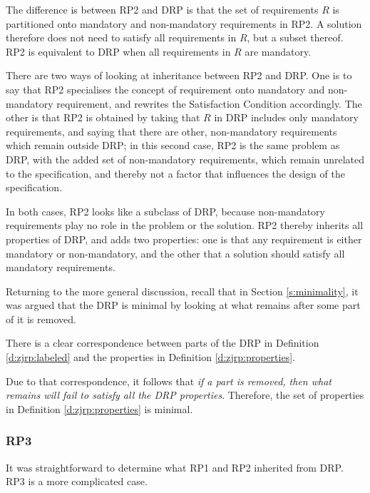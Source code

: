 \documentclass[graybox]{svmult}
\newcommand{\zi}[1]{\textit{#1}}
\newcommand{\ZJRP}{DRP}
\newcommand{\SatisfactionCondition}{Satisfaction Condition}
\begin{document}
The difference is between RP2 and \ZJRP{} is that the set of requirements $R$ is partitioned onto mandatory and non-mandatory requirements in RP2. A solution therefore does not need to satisfy all requirements in $R$, but a subset thereof. RP2 is equivalent to \ZJRP{} when all requirements in $R$ are mandatory. 

There are two ways of looking at inheritance between RP2 and \ZJRP. One is to say that RP2 specialises the concept of requirement onto mandatory and non-mandatory requirement, and rewrites the \SatisfactionCondition{} accordingly. The other is that RP2 is obtained by taking that $R$ in \ZJRP{} includes only mandatory requirements, and saying that there are other, non-mandatory requirements which remain outside \ZJRP; in this second case, RP2 is the same problem as \ZJRP, with the added set of non-mandatory requirements, which remain unrelated to the specification, and thereby not a factor that influences the design of the specification. 

In both cases, RP2 looks like a subclass of \ZJRP, because non-mandatory requirements play no role in the problem or the solution. RP2 thereby inherits all properties of \ZJRP, and adds two properties: one is that any requirement is either mandatory or non-mandatory, and the other that a solution should satisfy all mandatory requirements.

Returning to the more general discussion, recall that in Section \ref{s:minimality}, it was argued that the \ZJRP{} is minimal by looking at what remains after some part of it is removed. 

There is a clear correspondence between parts of the \ZJRP{} in Definition \ref{d:zjrp:labeled} and the properties in Definition \ref{d:zjrp:properties}. 

Due to that correspondence, it follows that \zi{if a part is removed, then what remains will fail to satisfy all the \ZJRP{} properties}. Therefore, the set of properties in Definition \ref{d:zjrp:properties} is minimal.

\subsubsection{RP3} It was straightforward to determine what RP1 and RP2 inherited from \ZJRP. RP3 is a more complicated case.
\end{document}
